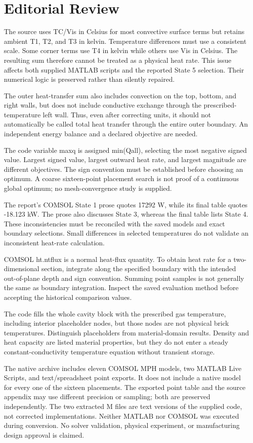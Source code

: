 \documentclass[11pt,a4paper]{article}
\begin{document}
\section{Editorial Review}
The source uses TC/Vis in Celsius for most convective surface terms but retains ambient T1, T2, and T3 in kelvin. Temperature differences must use a consistent scale. Some corner terms use T4 in kelvin while others use Vis in Celsius. The resulting sum therefore cannot be treated as a physical heat rate. This issue affects both supplied MATLAB scripts and the reported State 5 selection. Their numerical logic is preserved rather than silently repaired.

The outer heat-transfer sum also includes convection on the top, bottom, and right walls, but does not include conductive exchange through the prescribed-temperature left wall. Thus, even after correcting units, it should not automatically be called total heat transfer through the entire outer boundary. An independent energy balance and a declared objective are needed.

The code variable maxq is assigned min(Qall), selecting the most negative signed value. Largest signed value, largest outward heat rate, and largest magnitude are different objectives. The sign convention must be established before choosing an optimum. A coarse sixteen-point placement search is not proof of a continuous global optimum; no mesh-convergence study is supplied.

The report's COMSOL State 1 prose quotes 17292 W, while its final table quotes -18.123 kW. The prose also discusses State 3, whereas the final table lists State 4. These inconsistencies must be reconciled with the saved models and exact boundary selections. Small differences in selected temperatures do not validate an inconsistent heat-rate calculation.

COMSOL ht.ntflux is a normal heat-flux quantity. To obtain heat rate for a two-dimensional section, integrate along the specified boundary with the intended out-of-plane depth and sign convention. Summing point samples is not generally the same as boundary integration. Inspect the saved evaluation method before accepting the historical comparison values.

The code fills the whole cavity block with the prescribed gas temperature, including interior placeholder nodes, but those nodes are not physical brick temperatures. Distinguish placeholders from material-domain results. Density and heat capacity are listed material properties, but they do not enter a steady constant-conductivity temperature equation without transient storage.

The native archive includes eleven COMSOL MPH models, two MATLAB Live Scripts, and text/spreadsheet point exports. It does not include a native model for every one of the sixteen placements. The exported point table and the source appendix may use different precision or sampling; both are preserved independently. The two extracted M files are text versions of the supplied code, not corrected implementations. Neither MATLAB nor COMSOL was executed during conversion. No solver validation, physical experiment, or manufacturing design approval is claimed.
\end{document}
